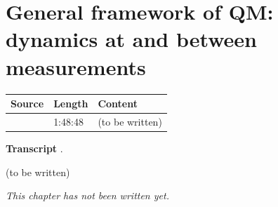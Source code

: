 \chapter{General framework of QM: dynamics at and between measurements}\label{ch:c11}
\begin{paracol}{2}

\begin{sources}
\begin{tabularx}{\linewidth}{@{}l l L@{}}
\toprule
\textbf{Source} & \textbf{Length} & \textbf{Content}\\
\midrule
{} & 1:48:48 & (to be written)\\
\bottomrule
\end{tabularx}

\smallskip
\textbf{Transcript} .
\end{sources}

\begin{reading}
(to be written)
\end{reading}

\emph{This chapter has not been written yet.}

\flushside
\end{paracol}
